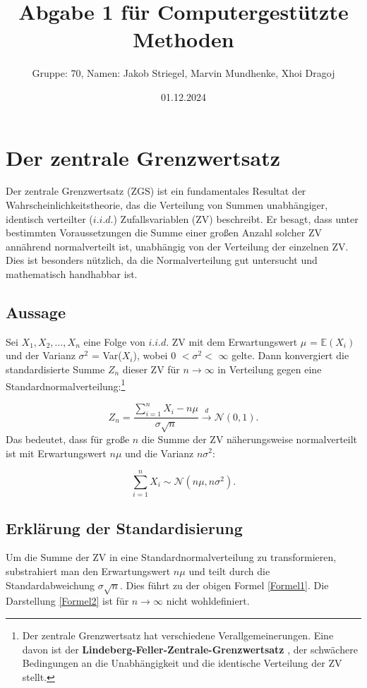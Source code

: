 \documentclass{article}
\title{Abgabe 1 für Computergestützte Methoden}
\author{Gruppe: 70, Namen: Jakob Striegel, Marvin Mundhenke, Xhoi Dragoj}
\date{01.12.2024}
\begin{document}
\maketitle
\tableofcontents
\newpage
\section{Der zentrale Grenzwertsatz}
Der zentrale Grenzwertsatz (ZGS) ist ein fundamentales Resultat der Wahrscheinlichkeitstheorie, das die Verteilung von Summen unabhängiger, identisch verteilter ($i.i.d.$) Zufallsvariablen (ZV) beschreibt. Er besagt, dass unter bestimmten Voraussetzungen die Summe einer großen Anzahl solcher ZV annährend normalverteilt ist, unabhängig von der Verteilung der einzelnen ZV. Dies ist besonders nützlich, da die Normalverteilung gut untersucht und mathematisch handhabbar ist.



\subsection{Aussage}
Sei $ X_{1} ,X_{2},..., X_{n} $ eine Folge von $i.i.d.$ ZV mit dem Erwartungswert $\mu$  = $\mathbb{E}(X_{i})$ 
und der Varianz $\sigma^2$ = Var($X_{i}$), wobei  0 $< \sigma^2 <$ $ \infty$ gelte. Dann konvergiert
die standardisierte Summe $Z_{n}$  dieser ZV für $n \to  \infty$  in Verteilung gegen eine
Standardnormalverteilung:\footnote[1]{Der zentrale Grenzwertsatz hat verschiedene Verallgemeinerungen. Eine davon ist der \textbf{Lindeberg-Feller-Zentrale-Grenzwertsatz} \citep[Seite 328]{klenke}, der schwächere Bedingungen an die Unabhängigkeit und die identische Verteilung der ZV stellt.}

\begin{equation}
    \label{Formel1}
    Z_{n}= \frac{\sum_{i=1}^{n} X_{i}-n\mu}{\sigma \sqrt{n}} \overset{d}{\to} \mathcal{N}(0,1).
\end{equation}
Das bedeutet, dass für große $n$ die Summe der ZV näherungsweise normalverteilt ist mit Erwartungswert $n\mu$ und die Varianz $n\sigma^2$:

\begin{equation}
    \label{Formel2}
    \sum_{i=1}^{n} X_{i} \sim \mathcal{N}(n\mu,n\sigma^2).
\end{equation}



\subsection{Erklärung der Standardisierung}
Um die Summe der ZV in eine Standardnormalverteilung zu transformieren, substrahiert man den Erwartungswert $n\mu$ und teilt durch die Standardabweichung $\sigma\sqrt{n}$. Dies führt zu der obigen Formel \eqref{Formel1}. Die Darstellung \eqref{Formel2} ist für $n \to \infty$ nicht wohldefiniert.
\end{document}

